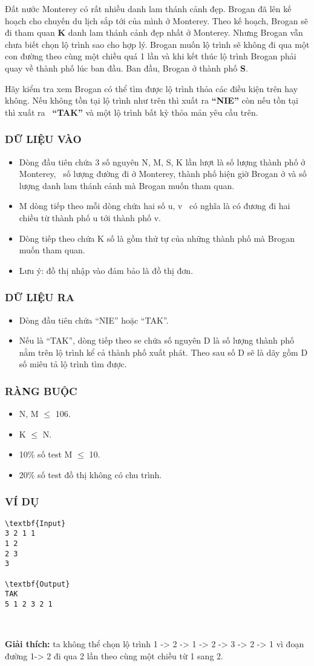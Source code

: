 

Đất nước Monterey có rất nhiều danh lam thánh cảnh đẹp. Brogan đã lên kế hoạch cho chuyến du lịch sắp tới của mình ở Monterey. Theo kế hoạch, Brogan sẽ đi tham quan \textbf{K} danh lam thánh cảnh đẹp nhất ở Monterey. Nhưng Brogan vẫn chưa biết chọn lộ trình sao cho hợp lý. Brogan muốn lộ trình sẽ không đi qua một con đường theo cùng một chiều quá 1 lần và khi kết thúc lộ trình Brogan phải quay về thành phố lúc ban đầu. Ban đầu, Brogan ở thành phố \textbf{S}.

Hãy kiểm tra xem Brogan có thể tìm được lộ trình thỏa các điều kiện trên hay không. Nếu không tồn tại lộ trình như trên thì xuất ra \textbf{“NIE”} còn nếu tồn tại thì xuất ra  \textbf{“TAK”} và một lộ trình bất kỳ thỏa mản yêu cầu trên.

\subsubsection{DỮ LIỆU VÀO}
\begin{itemize}
	\item Dòng đầu tiên chứa 3 số nguyên N, M, S, K lần lượt là số lượng thành phố ở Monterey,  số lượng đường đi ở Monterey, thành phố hiện giờ Brogan ở và số lượng danh lam thánh cảnh mà Brogan muốn tham quan.
	\item M dòng tiếp theo mỗi dòng chứa hai số u, v  có nghĩa là có đương đi hai chiều từ thành phố u tới thành phố v.
	\item Dòng tiếp theo chứa K số là gồm thử tự của những thành phố mà Brogan muốn tham quan.
	\item Lưu ý: đồ thị nhập vào đảm bảo là đồ thị đơn.
\end{itemize}

\subsubsection{DỮ LIỆU RA}
\begin{itemize}
	\item Dòng đầu tiên chứa “NIE” hoặc “TAK”.
	\item Nếu là “TAK”, dòng tiếp theo se chứa số nguyên D là số lượng thành phố nằm trên lộ trình kể cả thành phố xuất phát. Theo sau số D sẽ là dãy gồm D số miêu tả lộ trình tìm được.
\end{itemize}

\subsubsection{RÀNG BUỘC}
\begin{itemize}
	\item N, M  $\le$  106.
	\item K  $\le$  N.
	\item 10\% số test M  $\le$  10.
	\item 20\% số test đồ thị không có chu trình.
\end{itemize}

\subsubsection{VÍ DỤ}
\begin{verbatim}
\textbf{Input}
3 2 1 1
1 2
2 3
3

\textbf{Output}
TAK
5 1 2 3 2 1\end{verbatim}

 

\textbf{Giải thích:} ta không thể chọn lộ trình 1 -> 2 -> 1 -> 2 -> 3 -> 2 -> 1 vì đoạn đường 1-> 2 đi qua 2 lần theo cùng một chiều từ 1 sang 2.
